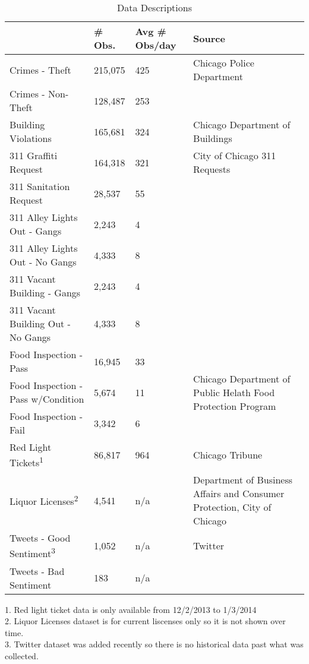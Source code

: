 \documentclass{article}
\begin{document}
\begin{table}
\begin{threeparttable}
\caption{Data Descriptions}
\begin{tabular}{ |p{6cm}||p{2cm}|p{3cm}|p{6cm}|  }
 \hline
 \hline
 & \# Obs. &  Avg \# Obs/day & Source\\
 \hline
 Crimes - Theft                      & 215,075    & 425     & Chicago Police Department \\
 Crimes - Non-Theft                  & 128,487    & 253     & \\
 \hline
 Building Violations                 & 165,681    & 324     & Chicago Department of Buildings\\
 \hline
 311 Graffiti Request                & 164,318    & 321     & City of Chicago 311 Requests \\
 311 Sanitation Request              & 28,537     & 55      & \\
 311 Alley Lights Out - Gangs        & 2,243      & 4       & \\
 311 Alley Lights Out - No Gangs     & 4,333      & 8       & \\
 311 Vacant Building - Gangs         & 2,243      & 4       & \\
 311 Vacant Building Out - No Gangs  & 4,333      & 8       & \\
 \hline
 Food Inspection - Pass              & 16,945     & 33 & \multirow{3}{4cm}{Chicago Department of Public Helath Food Protection Program} \\ 
 Food Inspection - Pass w/Condition  & 5,674      & 11 & \\ 
 Food Inspection - Fail              & 3,342      & 6  & \\ 
 \hline
 Red Light Tickets\textsuperscript{1}                   & 86,817     & 964     & Chicago Tribune\\
 \hline
 Liquor Licenses\textsuperscript{2}                     & 4,541      & n/a     & Department of Business Affairs and Consumer Protection, City of Chicago\\
 \hline
 Tweets - Good Sentiment\textsuperscript{3}          & 1,052        & n/a     & Twitter\\
 Tweets - Bad Sentiment                & 183         & n/a      & \\
 \hline
\end{tabular}
\begin{tablenotes}
      \small
      \item 1. Red light ticket data is only available from 12/2/2013 to 1/3/2014 \\
          2. Liquor Licenses dataset is for current liscenses only so it is not shown over time. \\
          3. Twitter dataset was added recently so there is no historical data past what was collected.
    \end{tablenotes}
    \end{threeparttable}
\end{table}
\end{document}

